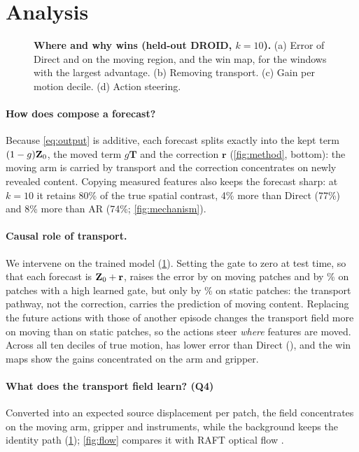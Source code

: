 \section{Analysis}
\label{sec:analysis}

\begin{figure}[t]
  \centering
  \caption{\textbf{Where and why \ours{} wins (held-out DROID, $k{=}10$).} (a) Error of Direct and \ours{} on the moving region, and the win map, for the windows with the largest advantage. (b) Removing transport. (c) Gain per motion decile. (d) Action steering.}
  \label{fig:qualitative}
\end{figure}


\paragraph{How does \ours{} compose a forecast?} Because \cref{eq:output} is additive, each forecast splits exactly into
the kept term $(1-g)\mathbf{Z}_0$, the moved term $g\mathbf{T}$ and the correction $\mathbf{r}$ (\cref{fig:method}, bottom): the
moving arm is carried by transport and the correction concentrates on newly revealed content. Copying measured features
also keeps the forecast sharp: at $k{=}10$ it retains 80\% of the true spatial contrast, 4\% more than Direct (77\%)
and 8\% more than AR (74\%; \cref{fig:mechanism}).

\paragraph{Causal role of transport.} We intervene on the trained model (\cref{fig:qualitative}). Setting the gate to
zero at test time, so that each forecast is $\mathbf{Z}_0+\mathbf{r}$, raises the error by \good{\koMoving\%} on moving patches and
by \koHighGate\% on patches with a high learned gate, but only by \koStatic\% on static patches: the transport pathway, not
the correction, carries the prediction of moving content. Replacing the future actions with those of another episode
changes the transport field \good{\steerRatio$\times$} more on moving than on static patches, so the actions steer
\emph{where} features are moved. Across all ten deciles of true motion, \ours{} has lower error than Direct
(), and the win maps show the gains concentrated on the arm and gripper.

\paragraph{What does the transport field learn? (Q4)} Converted into an expected source displacement per patch, the
field concentrates on the moving arm, gripper and instruments, while the background keeps the identity path
(\cref{fig:qualitative}); \cref{fig:flow} compares it with RAFT optical flow \citep{teed2020raft}.

